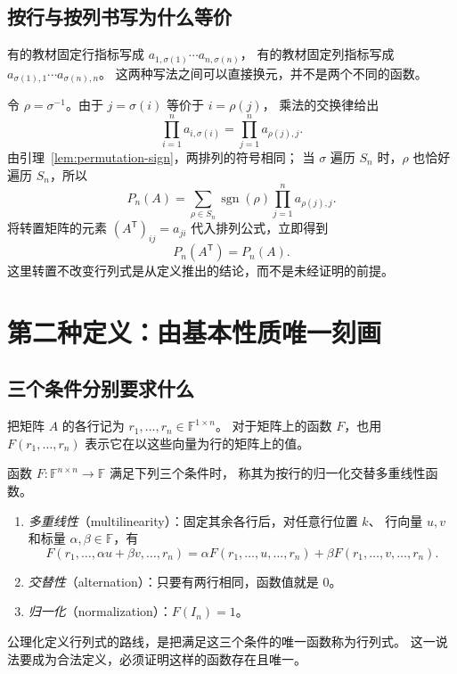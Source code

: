 \documentclass[UTF8,12pt,a4paper,fontset=fandol]{ctexart}
\begin{document}
\subsection{按行与按列书写为什么等价}

有的教材固定行指标写成 $a_{1,\sigma(1)}\cdots a_{n,\sigma(n)}$，
有的教材固定列指标写成 $a_{\sigma(1),1}\cdots a_{\sigma(n),n}$。
这两种写法之间可以直接换元，并不是两个不同的函数。

令 $\rho=\sigma^{-1}$。由于 $j=\sigma(i)$ 等价于 $i=\rho(j)$，
乘法的交换律给出
\[
  \prod_{i=1}^{n}a_{i,\sigma(i)}
  =\prod_{j=1}^{n}a_{\rho(j),j}.
\]
由引理~\ref{lem:permutation-sign}，两排列的符号相同；
当 $\sigma$ 遍历 $S_n$ 时，$\rho$ 也恰好遍历 $S_n$，所以
\begin{equation}
  P_n(A)=\sum_{\rho\in S_n}\operatorname{sgn}(\rho)
  \prod_{j=1}^{n}a_{\rho(j),j}.
  \label{eq:column-permutation}
\end{equation}
将转置矩阵的元素 $(A^{\mathsf T})_{ij}=a_{ji}$ 代入排列公式，立即得到
\begin{equation}
  P_n(A^{\mathsf T})=P_n(A).
  \label{eq:transpose-invariance}
\end{equation}
这里转置不改变行列式是从定义推出的结论，而不是未经证明的前提。

\section{第二种定义：由基本性质唯一刻画}
\label{sec:axiomatic-definition}

\subsection{三个条件分别要求什么}

把矩阵 $A$ 的各行记为 $r_1,\ldots,r_n\in\mathbb F^{1\times n}$。
对于矩阵上的函数 $F$，也用 $F(r_1,\ldots,r_n)$ 表示它在以这些向量为行的矩阵上的值。

\begin{definition}[归一化的交替多重线性函数]
\label{def:axioms}
函数 $F:\mathbb F^{n\times n}\to\mathbb F$ 满足下列三个条件时，
称其为按行的归一化交替多重线性函数。
\begin{enumerate}
  \item \emph{多重线性}（multilinearity）：固定其余各行后，对任意行位置 $k$、
  行向量 $u,v$ 和标量 $\alpha,\beta\in\mathbb F$，有
  \begin{equation}
    F(r_1,\ldots,\alpha u+\beta v,\ldots,r_n)
    =\alpha F(r_1,\ldots,u,\ldots,r_n)
     +\beta F(r_1,\ldots,v,\ldots,r_n).
    \label{eq:row-multilinearity}
  \end{equation}
  \item \emph{交替性}（alternation）：只要有两行相同，函数值就是 $0$。
  \item \emph{归一化}（normalization）：$F(I_n)=1$。
\end{enumerate}
公理化定义行列式的路线，是把满足这三个条件的唯一函数称为行列式。
这一说法要成为合法定义，必须证明这样的函数存在且唯一。
\end{definition}
\end{document}
